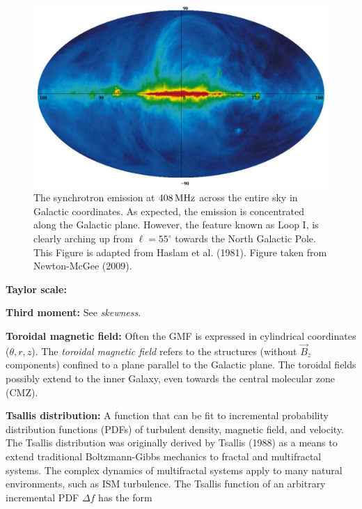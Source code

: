 \documentclass[a4paper,10pt]{article}
\begin{document}
\begin{figure}[h]
\begin{center}
\includegraphics[width=15cm]{figures/408MHz.png}
\caption{\footnotesize{The synchrotron emission at $408\,{\rm MHz}$ across the entire sky in Galactic coordinates. As expected, the emission is concentrated along the Galactic plane. However, the feature known as Loop I, is clearly arching up from $\ell=55^\circ$ towards the North Galactic Pole. This Figure is adapted from Haslam et al. (1981). Figure taken from Newton-McGee (2009).}}
\label{figure:408mhz}
\end{center}
\end{figure}

{\noindent}\textbf{Taylor scale:}

{\noindent}\textbf{Third moment:} See \textit{skewness}.

{\noindent}\textbf{Toroidal magnetic field:} Often the GMF is expressed in cylindrical coordinates ($\theta, r, z$). The \textit{toroidal magnetic field} refers to the structures (without $\vec{B}_z$ components) confined to a plane parallel to the Galactic plane. The toroidal fields possibly extend to the inner Galaxy, even towards the central molecular zone (CMZ).

{\noindent}\textbf{Tsallis distribution:} A function that can be fit to incremental probability distribution functions (PDFs) of turbulent density, magnetic field, and velocity. The Tsallis distribution was originally derived by Tsallis (1988) as a means to extend traditional Boltzmann-Gibbs mechanics to fractal and multifractal systems. The complex dynamics of multifractal systems apply to many natural environments, such as ISM turbulence. The Tsallis function of an arbitrary incremental PDF $\Delta f$ has the form
\end{document}
